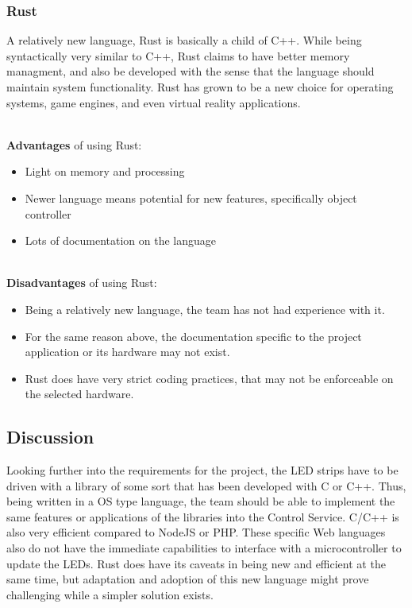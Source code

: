 \documentclass[onecolumn, draftclsnofoot,10pt, compsoc]{IEEEtran}
\begin{document}
			\subsubsection{Rust}
			A relatively new language, Rust is basically a child of C++.  While being syntactically very similar to C++, Rust claims to have better memory managment, and also be developed with the
			sense that the language should maintain system functionality.  Rust has grown to be a new choice for operating systems, game engines, and even virtual reality applications. \cite{LANG2}

			\noindent \\ \textbf{Advantages} of using Rust:
			\begin{itemize}
				\item Light on memory and processing
				\item Newer language means potential for new features, specifically object controller
				\item Lots of documentation on the language
			\end{itemize}

			\noindent \\ \textbf{Disadvantages} of using Rust:
			\begin{itemize}
				\item Being a relatively new language, the team has not had experience with it.
				\item For the same reason above, the documentation specific to the project application or its hardware may not exist.
				\item Rust does have very strict coding practices, that may not be enforceable on the selected hardware.
			\end{itemize}


			\subsection{Discussion}
			Looking further into the requirements for the project, the LED strips have to be driven with a library of some sort that has been developed with C or C++.  Thus, being written in a OS
			type language, the team should be able to implement the same features or applications of the libraries into the Control Service.  C/C++ is also very efficient compared to NodeJS or PHP.
			These specific Web languages also do not have the immediate capabilities to interface with a microcontroller to update the LEDs.  Rust does have its caveats in being new and efficient
			at the same time, but adaptation and adoption of this new language might prove challenging while a simpler solution exists.
\end{document}
